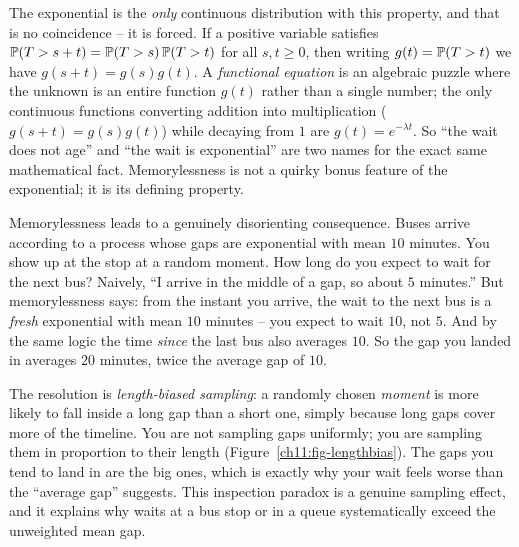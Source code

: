 \begin{happeningbox}
The exponential is the \emph{only} continuous
distribution with this property, and that is no coincidence -- it is forced. If
a positive variable satisfies $\P(T>s+t) = \P(T>s)\P(T>t)$ for all $s,t\ge0$,
then writing $g(t) = \P(T>t)$ we have $g(s+t)=g(s)g(t)$. A \emph{functional
equation} is an algebraic puzzle where the unknown is an entire function $g(t)$
rather than a single number; the only continuous functions converting addition into
multiplication ($g(s+t) = g(s)g(t)$) while decaying from $1$ are $g(t) =
e^{-\lambda t}$. So ``the wait does not age'' and ``the wait is exponential''
are two names for the exact same mathematical fact. Memorylessness is not a
quirky bonus feature of the exponential; it is its defining property.
\end{happeningbox}

\begin{paradoxbox}
Memorylessness leads to a genuinely disorienting consequence. Buses arrive
according to a process whose gaps are exponential with mean $10$ minutes. You
show up at the stop at a random moment. How long do you expect to wait for the
next bus? Naively, ``I arrive in the middle of a gap, so about $5$ minutes.''
But memorylessness says: from the instant you arrive, the wait to the next bus
is a \emph{fresh} exponential with mean $10$ minutes -- you expect to wait
$10$, not $5$. And by the same logic the time \emph{since} the last bus also
averages $10$. So the gap you landed in averages $20$ minutes, twice the
average gap of $10$.

The resolution is \emph{length-biased sampling}: a randomly chosen \emph{moment}
is more likely to fall inside a long gap than a short one, simply because long
gaps cover more of the timeline. You are not sampling gaps uniformly; you are
sampling them in proportion to their length (Figure~\ref{ch11:fig-lengthbias}).
The gaps you tend to land in are the big ones, which is exactly why your wait feels worse than the ``average
gap'' suggests. This inspection paradox is a genuine sampling effect, and it explains
why waits at a bus stop or in a queue systematically exceed
the unweighted mean gap.
\end{paradoxbox}

